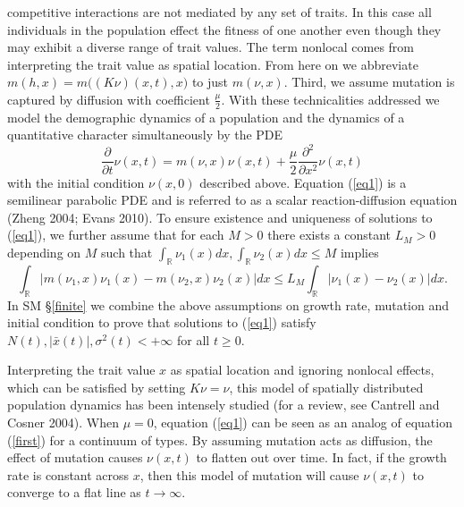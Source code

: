 \documentclass[]{article}
\begin{document}
competitive interactions are not mediated by any set of traits. In this
case all individuals in the population effect the fitness of one another
even though they may exhibit a diverse range of trait values. The term
nonlocal comes from interpreting the trait value as spatial location.
From here on we abbreviate \(m(h,x)=m\big((K\nu)(x,t),x\big)\) to just
\(m(\nu,x)\). Third, we assume mutation is captured by diffusion with
coefficient \(\frac{\mu}{2}\). With these technicalities addressed we
model the demographic dynamics of a population and the dynamics of a
quantitative character simultaneously by the PDE
\begin{equation}\label{eq1}
\frac{\partial}{\partial t}\nu(x,t)=m(\nu,x)\nu(x,t)+\frac{\mu}{2}\frac{\partial^2}{\partial x^2}\nu(x,t)
\end{equation} with the initial condition \(\nu(x,0)\) described above.
Equation (\ref{eq1}) is a semilinear parabolic PDE and is referred to as
a scalar reaction-diffusion equation (Zheng 2004; Evans 2010). To ensure
existence and uniqueness of solutions to (\ref{eq1}), we further assume
that for each \(M>0\) there exists a constant \(L_M>0\) depending on
\(M\) such that
\(\int_\mathbb{R}\nu_1(x)dx,\int_\mathbb{R}\nu_2(x)dx\leq M\) implies
\begin{equation}\label{local_lipschitz}
\int_\mathbb{R}\left|m(\nu_1,x)\nu_1(x)-m(\nu_2,x)\nu_2(x)\right|dx\leq L_M\int_\mathbb{R}|\nu_1(x)-\nu_2(x)|dx.
\end{equation} In SM \S\ref{finite} we combine the above assumptions on
growth rate, mutation and initial condition to prove that solutions to
(\ref{eq1}) satisfy \(N(t),|\bar x(t)|,\sigma^2(t)<+\infty\) for all
\(t\geq0\).

Interpreting the trait value \(x\) as spatial location and ignoring
nonlocal effects, which can be satisfied by setting \(K\nu=\nu\), this
model of spatially distributed population dynamics has been intensely
studied (for a review, see Cantrell and Cosner 2004). When \(\mu=0\),
equation (\ref{eq1}) can be seen as an analog of equation (\ref{first})
for a continuum of types. By assuming mutation acts as diffusion, the
effect of mutation causes \(\nu(x,t)\) to flatten out over time. In
fact, if the growth rate is constant across \(x\), then this model of
mutation will cause \(\nu(x,t)\) to converge to a flat line as
\(t\to\infty\).
\end{document}
